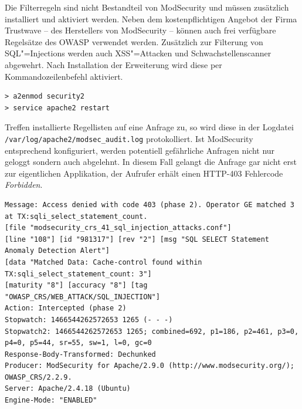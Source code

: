 Die Filterregeln sind nicht Bestandteil von ModSecurity und müssen zusätzlich installiert und aktiviert werden. Neben dem kostenpflichtigen Angebot der Firma Trustwave -- des Herstellers von ModSecurity -- können auch frei verfügbare Regelsätze des OWASP verwendet werden. Zusätzlich zur Filterung von SQL"=Injections werden auch XSS"=Attacken und Schwachstellenscanner abgewehrt. Nach Installation der Erweiterung wird diese per Kommandozeilenbefehl aktiviert.

\begin{listing}[ht!]
\begin{verbatim}
> a2enmod security2
> service apache2 restart
\end{verbatim}
\end{listing}


Treffen installierte Regellisten auf eine Anfrage zu, so wird diese in der Logdatei \texttt{/var/log/apache2/modsec\_audit.log} protokolliert. Ist ModSecurity entsprechend konfiguriert, werden potentiell gefährliche Anfragen nicht nur geloggt sondern auch abgelehnt. In diesem Fall gelangt die Anfrage gar nicht erst zur eigentlichen Applikation, der Aufrufer erhält einen HTTP-403 Fehlercode \emph{Forbidden}.

\begin{listing}[ht!]

\begin{verbatim}
Message: Access denied with code 403 (phase 2). Operator GE matched 3 at TX:sqli_select_statement_count.
[file "modsecurity_crs_41_sql_injection_attacks.conf"]
[line "108"] [id "981317"] [rev "2"] [msg "SQL SELECT Statement Anomaly Detection Alert"]
[data "Matched Data: Cache-control found within TX:sqli_select_statement_count: 3"]
[maturity "8"] [accuracy "8"] [tag "OWASP_CRS/WEB_ATTACK/SQL_INJECTION"]
Action: Intercepted (phase 2)
Stopwatch: 1466544262572653 1265 (- - -)
Stopwatch2: 1466544262572653 1265; combined=692, p1=186, p2=461, p3=0, p4=0, p5=44, sr=55, sw=1, l=0, gc=0
Response-Body-Transformed: Dechunked
Producer: ModSecurity for Apache/2.9.0 (http://www.modsecurity.org/); OWASP_CRS/2.2.9.
Server: Apache/2.4.18 (Ubuntu)
Engine-Mode: "ENABLED"
\end{verbatim}
\end{listing}



